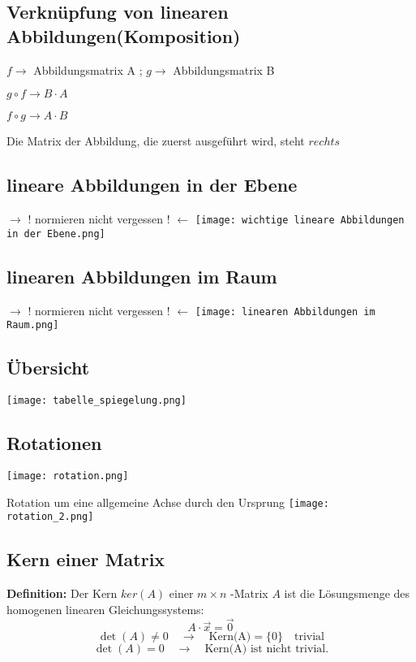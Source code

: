 \begin{multicols*}{3}
    \vfill\null
    \columnbreak
    \subsection{  Verknüpfung von linearen Abbildungen(Komposition)
    }
    {$f \to $ Abbildungsmatrix A ; $g \to $ Abbildungsmatrix B}

    {$g \circ f \to B \cdot A$  }

    {$f \circ g \to A \cdot B$  }

    {Die Matrix der Abbildung, die zuerst ausgeführt wird, steht $rechts$}

    \subsection{ lineare Abbildungen in der Ebene}
    {$\rightarrow $ $!$ normieren nicht vergessen $!$ $\leftarrow$}
    {\texttt{[image: wichtige lineare Abbildungen in der Ebene.png]}}

    \subsection{ linearen Abbildungen im Raum}
    {$\rightarrow $ $!$ normieren nicht vergessen $!$ $\leftarrow$}
    {\texttt{[image: linearen Abbildungen im Raum.png]}}
    \vfill\null
    \columnbreak
    
    \subsection{ Übersicht}
    {\texttt{[image: tabelle\_spiegelung.png]}}
    
    \subsection{ Rotationen}

    {\texttt{[image: rotation.png]}}

    {Rotation um eine allgemeine Achse durch den Ursprung}
    {\texttt{[image: rotation\_2.png]}}
    \vfill\null
    \columnbreak
    \subsection{ Kern einer Matrix}
    {\textbf{Definition:} Der Kern $ker(A)$ einer $m\times n$ -Matrix $A$ ist die Lösungsmenge des homogenen linearen
        Gleichungssystems: $$A\cdot \vec{x} = \vec{0}$$}
    {$$\det(A) \neq 0 \quad \rightarrow \quad \text{Kern(A)}=\{0\} \quad \text{trivial}$$}
    {$$\det(A)=0 \quad \rightarrow \quad \text{Kern(A) ist nicht trivial}.$$}


\end{multicols*}
